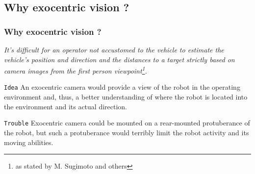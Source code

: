 \subsection{Why exocentric vision ?}
\frame
{
  \frametitle{Why exocentric vision ?}
  
  \emph{It's difficult for an operator not accustomed to the vehicle
    to estimate the vehicle's position and direction and the distances to a target strictly
    based on camera images from the first person viewpoint\footnote{\tiny{as stated by M. Sugimoto and others}}.}
  \pause
  
  \vskip15pt

  \begin{block} {\alert{\texttt{Idea}}}
    An exocentric camera would provide a view of the robot in the operating
    environment and, thus, a better understanding of where the robot is located into the
    environment and its actual direction.
  \end{block}
  
  \pause
    
  \vskip5pt
  
  \begin{block} {\alert{\texttt{Trouble}}}
    Exocentric camera could be mounted on a rear-mounted protuberance of the robot,
    but such a protuberance would terribly limit the robot activity and its moving abilities.
  \end{block}
  
}

